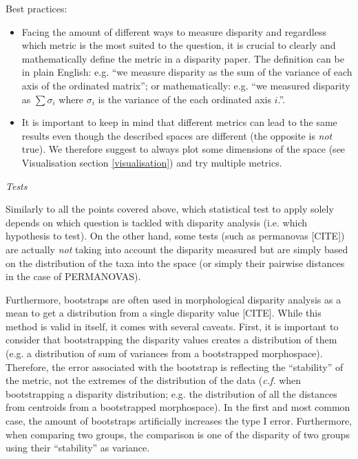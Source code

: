 \documentclass[12pt,letterpaper]{article}
\renewcommand{\subsection}[1]{%
\bigskip
\begin{center}
\begin{large}
\normalfont\itshape #1
\end{large}
\end{center}}
\begin{document}
Best practices:
\begin{itemize}
\item Facing the amount of different ways to measure disparity and regardless which metric is the most suited to the question, it is crucial to clearly and mathematically define the metric in a disparity paper. The definition can be in plain English: e.g. ``we measure disparity as the sum of the variance of each axis of the ordinated matrix''; or mathematically: e.g. ``we measured disparity as $\sum\sigma_i$ where $\sigma_i$ is the variance of the each ordinated axis $i$.''.
\item It is important to keep in mind that different metrics can lead to the same results even though the described spaces are different (the opposite is \textit{not} true). We therefore suggest to always plot some dimensions of the space (see Visualisation section \ref{visualisation}) and try multiple metrics.
\end{itemize}

\subsection{Tests}
Similarly to all the points covered above, which statistical test to apply solely depends on which question is tackled with disparity analysis (i.e. which hypothesis to test).
On the other hand, some tests (such as permanovas [CITE]) are actually \textit{not} taking into account the disparity measured but are simply based on the distribution of the taxa into the space (or simply their pairwise distances in the case of PERMANOVAS).

Furthermore, bootstraps are often used in morphological disparity analysis as a mean to get a distribution from a single disparity value [CITE].
While this method is valid in itself, it comes with several caveats.
First, it is important to consider that bootstrapping the disparity values creates a distribution of them (e.g. a distribution of sum of variances from a bootstrapped morphospace).
Therefore, the error associated with the bootstrap is reflecting the ``stability'' of the metric, not the extremes of the distribution of the data (\textit{c.f.} when bootstrapping a disparity distribution; e.g. the distribution of all the distances from centroids from a bootstrapped morphospace).
In the first and most common case, the amount of bootstraps artificially increases the type I error.
Furthermore, when comparing two groups, the comparison is one of the disparity of two groups using their ``stability'' as variance. 
\end{document}
